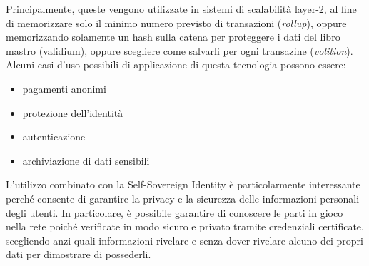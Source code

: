 Principalmente, queste vengono utilizzate in sistemi di scalabilità layer-2, al fine di memorizzare solo il minimo numero previsto di transazioni (\textit{rollup}),
oppure memorizzando solamente un hash sulla catena per proteggere i dati del libro mastro (validium), oppure scegliere come salvarli per ogni transazine (\textit{volition}).
Alcuni casi d'uso possibili di applicazione di questa tecnologia possono essere:
\begin{itemize}
    \item{pagamenti anonimi}
    \item{protezione dell'identità}
    \item{autenticazione}
    \item{archiviazione di dati sensibili}
\end{itemize}

L'utilizzo combinato con la Self-Sovereign Identity è particolarmente interessante perché consente di garantire la privacy e la sicurezza delle informazioni personali degli utenti.
In particolare, è possibile garantire di conoscere le parti in gioco nella rete poiché verificate
in modo sicuro e privato tramite credenziali certificate, scegliendo anzi quali informazioni rivelare e senza
dover rivelare alcuno dei propri dati per dimostrare di possederli. 
